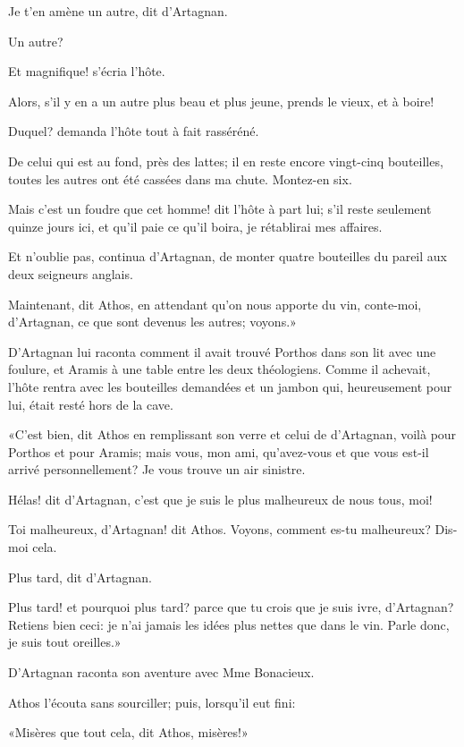 \speak  Je t'en amène un autre, dit d'Artagnan. 

\speak  Un autre? 

\speak  Et magnifique! s'écria l'hôte. 

\speak  Alors, s'il y en a un autre plus beau et plus jeune, prends le vieux, et à boire! 

\speak  Duquel? demanda l'hôte tout à fait rasséréné. 

\speak  De celui qui est au fond, près des lattes; il en reste encore vingt-cinq bouteilles, toutes les autres ont été cassées dans ma chute. Montez-en six. 

\speak  Mais c'est un foudre que cet homme! dit l'hôte à part lui; s'il reste seulement quinze jours ici, et qu'il paie ce qu'il boira, je rétablirai mes affaires. 

\speak  Et n'oublie pas, continua d'Artagnan, de monter quatre bouteilles du pareil aux deux seigneurs anglais. 

\speak  Maintenant, dit Athos, en attendant qu'on nous apporte du vin, conte-moi, d'Artagnan, ce que sont devenus les autres; voyons.» 

D'Artagnan lui raconta comment il avait trouvé Porthos dans son lit avec une foulure, et Aramis à une table entre les deux théologiens. Comme il achevait, l'hôte rentra avec les bouteilles demandées et un jambon qui, heureusement pour lui, était resté hors de la cave. 

«C'est bien, dit Athos en remplissant son verre et celui de d'Artagnan, voilà pour Porthos et pour Aramis; mais vous, mon ami, qu'avez-vous et que vous est-il arrivé personnellement? Je vous trouve un air sinistre. 

\speak  Hélas! dit d'Artagnan, c'est que je suis le plus malheureux de nous tous, moi! 

\speak  Toi malheureux, d'Artagnan! dit Athos. Voyons, comment es-tu malheureux? Dis-moi cela. 

\speak  Plus tard, dit d'Artagnan. 

\speak  Plus tard! et pourquoi plus tard? parce que tu crois que je suis ivre, d'Artagnan? Retiens bien ceci: je n'ai jamais les idées plus nettes que dans le vin. Parle donc, je suis tout oreilles.» 

D'Artagnan raconta son aventure avec Mme Bonacieux. 

Athos l'écouta sans sourciller; puis, lorsqu'il eut fini: 

«Misères que tout cela, dit Athos, misères!» 

